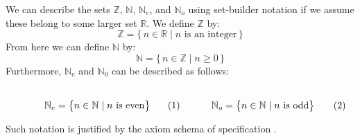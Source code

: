         \begin{example}
            We can describe the sets $\mathbb{Z}$, $\mathbb{N}$,
            $\mathbb{N}_{e}$, and $\mathbb{N}_{o}$ using set-builder notation if
            we assume these belong to some larger set $\mathbb{R}$. We define
            $\mathbb{Z}$ by:
            \begin{equation}
                \mathbb{Z}=
                \big\{\,n\in\mathbb{R}\;|\;n\textrm{ is an integer}\,\big\}
            \end{equation}
            From here we can define $\mathbb{N}$ by:
            \begin{equation}
                \mathbb{N}=\{\,n\in\mathbb{Z}\;|\;n\geq{0}\,\}
            \end{equation}
            Furthermore, $\mathbb{N}_{e}$ and $\mathbb{N}_{0}$ can be described
            as follows:
            \par
            \begin{subequations}
                \begin{minipage}[b]{0.495\textwidth}
                    \centering
                    \begin{equation}
                        \label{eqn:Even_Pos_Ints_Set_Builder}%
                        \mathbb{N}_{e}=
                        \big\{n\in\mathbb{N}\;|\;n\textrm{ is even}\big\}
                    \end{equation}
                \end{minipage}
                \hfill
                \begin{minipage}[b]{0.495\textwidth}
                    \centering
                    \begin{equation}
                        \label{eqn:Odd_Pos_Ints_Set_Builder}%
                        \mathbb{N}_{o}=
                        \big\{n\in\mathbb{N}\;|\;n\textrm{ is odd}\big\}
                    \end{equation}
                \end{minipage}
            \end{subequations}
            \par\vspace{2.5ex}
            Such notation is justified by the axiom schema of specification%
            .
        \end{example}
